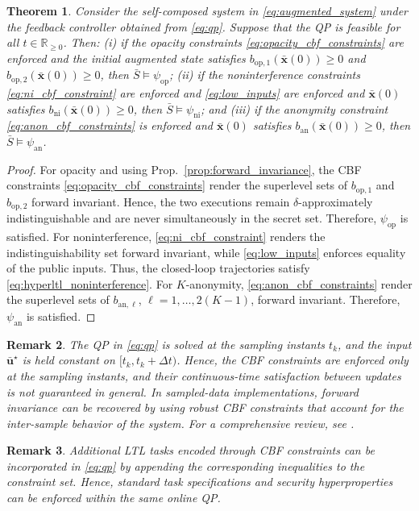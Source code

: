 \documentclass[journal,twoside,web]{ieeecolor}
\newtheorem{theorem}{Theorem}[section]
\newtheorem{remark}[theorem]{Remark}
\begin{document}
\begin{theorem}
\label{thm:qp}
    Consider the self-composed system in \eqref{eq:augmented_system} under the feedback controller obtained from \eqref{eq:qp}. Suppose that the QP is feasible for all $t \in \mathbb{R}_{\ge 0}$. Then: (i) if the opacity constraints \eqref{eq:opacity_cbf_constraints} are enforced and the initial augmented state satisfies $b_{\mathrm{op},1}(\bar{\mathbf{x}}(0))\ge 0$ and $b_{\mathrm{op},2}(\bar{\mathbf{x}}(0))\ge 0$, then $\bar{S} \models \psi_{\mathrm{op}}$; (ii) if the noninterference constraints \eqref{eq:ni_cbf_constraint} are enforced and \eqref{eq:low_inputs} are enforced and $\bar{\mathbf{x}}(0)$ satisfies $b_{\mathrm{ni}}(\bar{\mathbf{x}}(0))\ge 0$, then $\bar{S} \models \psi_{\mathrm{ni}}$; and (iii) if the anonymity constraint \eqref{eq:anon_cbf_constraints} is enforced and $\bar{\mathbf{x}}(0)$ satisfies $b_{\mathrm{an}}(\bar{\mathbf{x}}(0)) \ge 0$, then $\bar{S} \models \psi_{\mathrm{an}}$.
\end{theorem}
\begin{proof}
    For opacity and using Prop.~\ref{prop:forward_invariance}, the CBF constraints \eqref{eq:opacity_cbf_constraints} render the superlevel sets of $b_{\mathrm{op},1}$ and $b_{\mathrm{op},2}$ forward invariant. Hence, the two executions remain $\delta$-approximately indistinguishable and are never simultaneously in the secret set. Therefore, $\psi_{\mathrm{op}}$ is satisfied.
    For noninterference, \eqref{eq:ni_cbf_constraint} renders the indistinguishability set forward invariant, while \eqref{eq:low_inputs} enforces equality of the public inputs. Thus, the closed-loop trajectories satisfy \eqref{eq:hyperltl_noninterference}.
    For $K$-anonymity, \eqref{eq:anon_cbf_constraints} render the superlevel sets of $b_{\mathrm{an}, \ell}$, $\ell = 1, \dots, 2(K-1)$, forward invariant. Therefore, $\psi_{\mathrm{an}}$ is satisfied.
\end{proof}
\begin{remark}
    The QP in \eqref{eq:qp} is solved at the sampling instants $t_k$, and the input $\bar{\mathbf{u}}^\star$ is held constant on $[t_k, t_k + \Delta t)$. Hence, the CBF constraints are enforced only at the sampling instants, and their continuous-time satisfaction between updates is not guaranteed in general. In sampled-data implementations, forward invariance can be recovered by using robust CBF constraints that account for the inter-sample behavior of the system. For a comprehensive review, see \cite{garg2024}.
\end{remark}
\begin{remark} \label{rem:security_and_LTL}
    Additional LTL tasks encoded through CBF constraints \cite{srinivasan2021} can be incorporated in \eqref{eq:qp} by appending the corresponding inequalities to the constraint set. Hence, standard task specifications and security hyperproperties can be enforced within the same online QP.
\end{remark}
\end{document}
